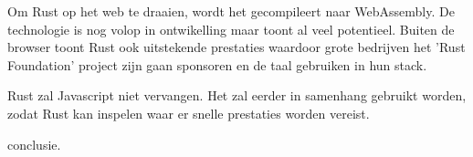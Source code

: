 \documentclass[11pt,a4paper,oneside]{book}
\begin{document}
Om Rust op het web te draaien, wordt het gecompileert naar WebAssembly. De technologie is nog volop
in ontwikelling maar toont al veel potentieel. Buiten de browser toont Rust ook uitstekende
prestaties waardoor grote bedrijven het 'Rust Foundation' project zijn gaan sponsoren en de taal
gebruiken in hun stack.

Rust zal Javascript niet vervangen. Het zal eerder in samenhang gebruikt worden, zodat Rust kan
inspelen waar er snelle prestaties worden vereist.

conclusie.


\tableofcontents


\listoffigures

\printglossary[title=Lijst met afkortingen,toctitle=Lijst met afkortingen,type=acronym]
\printglossary[title=Verklarende woordenlijst,toctitle=Verklarende woordenlijst,type=main]
\glsaddallunused









\appendix


\end{document}
